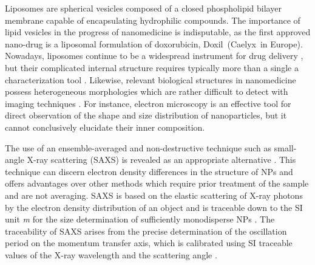 Liposomes are spherical vesicles composed of a closed phospholipid bilayer membrane capable of encapsulating hydrophilic compounds. The importance of lipid vesicles in the progress of nanomedicine is indisputable, as the first approved nano-drug is a liposomal formulation of doxorubicin, Doxil\textregistered\ (Caelyx\textregistered\ in Europe). Nowadays, liposomes continue to be a widespread instrument for drug delivery \citep{perez-herrero_advanced_2015}, but their complicated internal structure requires typically more than a single a characterization tool \citep{khorasani_closing_2014}. Likewise, relevant biological structures in nanomedicine possess heterogeneous morphologies which are rather difficult to detect with imaging techniques \citep{baumstark_structure_1990,varga_closer_2010}. For instance, electron microscopy is an effective tool for direct observation of the shape and size distribution of nanoparticles, but it cannot conclusively elucidate their inner composition.

The use of an ensemble-averaged and non-destructive technique such as small-angle X-ray scattering (SAXS) is revealed as an appropriate alternative \citep{leonard_jr_size_1952,motzkus_untersuchung_1959}. This technique can discern electron density differences in the structure of NPs and offers advantages over other methods which require prior treatment of the sample and are not averaging. SAXS is based on the elastic scattering of X-ray photons by the electron density distribution of an object and is traceable down to the SI unit \emph{m} for the size determination of sufficiently monodisperse NPs \citep{meli_traceable_2012}. The traceability of SAXS arises from the precise determination of the oscillation period on the momentum transfer axis, which is calibrated using SI traceable values of the X-ray wavelength and the scattering angle \citep{krumrey_synchrotron_2011}.

